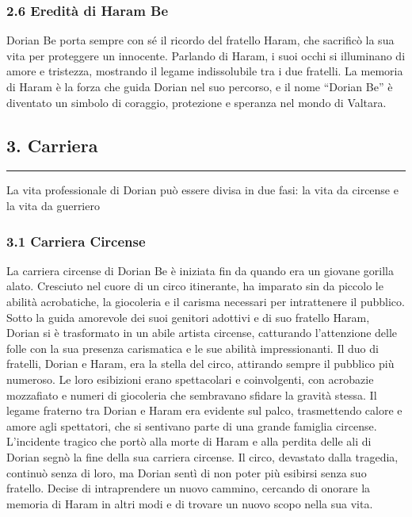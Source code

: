 \subsubsection{\texorpdfstring{2.6 \textbf{Eredità di Haram
Be}}{2.6 Eredità di Haram Be}}\label{eredituxe0-di-haram-be}

Dorian Be porta sempre con sé il ricordo del fratello Haram, che
sacrificò la sua vita per proteggere un innocente. Parlando di Haram, i
suoi occhi si illuminano di amore e tristezza, mostrando il legame
indissolubile tra i due fratelli. La memoria di Haram è la forza che
guida Dorian nel suo percorso, e il nome ``Dorian Be'' è diventato un
simbolo di coraggio, protezione e speranza nel mondo di Valtara.

\subsection{3. Carriera}\label{carriera}

\begin{center}\rule{0.5\linewidth}{0.5pt}\end{center}

La vita professionale di Dorian può essere divisa in due fasi: la vita
da circense e la vita da guerriero

\subsubsection{3.1 Carriera Circense}\label{carriera-circense}

La carriera circense di Dorian Be è iniziata fin da quando era un
giovane gorilla alato. Cresciuto nel cuore di un circo itinerante, ha
imparato sin da piccolo le abilità acrobatiche, la giocoleria e il
carisma necessari per intrattenere il pubblico. Sotto la guida amorevole
dei suoi genitori adottivi e di suo fratello Haram, Dorian si è
trasformato in un abile artista circense, catturando l'attenzione delle
folle con la sua presenza carismatica e le sue abilità impressionanti.
Il duo di fratelli, Dorian e Haram, era la stella del circo, attirando
sempre il pubblico più numeroso. Le loro esibizioni erano spettacolari e
coinvolgenti, con acrobazie mozzafiato e numeri di giocoleria che
sembravano sfidare la gravità stessa. Il legame fraterno tra Dorian e
Haram era evidente sul palco, trasmettendo calore e amore agli
spettatori, che si sentivano parte di una grande famiglia circense.
L'incidente tragico che portò alla morte di Haram e alla perdita delle
ali di Dorian segnò la fine della sua carriera circense. Il circo,
devastato dalla tragedia, continuò senza di loro, ma Dorian sentì di non
poter più esibirsi senza suo fratello. Decise di intraprendere un nuovo
cammino, cercando di onorare la memoria di Haram in altri modi e di
trovare un nuovo scopo nella sua vita.

